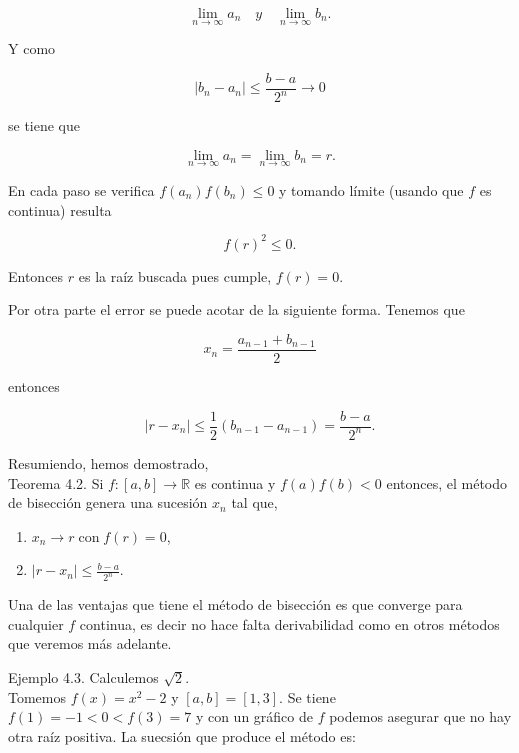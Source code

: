 \documentclass[10pt]{book}
\begin{document}
$$
\lim _{n \rightarrow \infty} a_{n} \quad y \quad \lim _{n \rightarrow \infty} b_{n} .
$$

Y como

$$
\left|b_{n}-a_{n}\right| \leq \frac{b-a}{2^{n}} \rightarrow 0
$$

se tiene que

$$
\lim _{n \rightarrow \infty} a_{n}=\lim _{n \rightarrow \infty} b_{n}=r .
$$

En cada paso se verifica $f\left(a_{n}\right) f\left(b_{n}\right) \leq 0$ y tomando límite (usando que $f$ es continua) resulta

$$
f(r)^{2} \leq 0 .
$$

Entonces $r$ es la raíz buscada pues cumple, $f(r)=0$.

Por otra parte el error se puede acotar de la siguiente forma. Tenemos que

$$
x_{n}=\frac{a_{n-1}+b_{n-1}}{2}
$$

entonces

$$
\left|r-x_{n}\right| \leq \frac{1}{2}\left(b_{n-1}-a_{n-1}\right)=\frac{b-a}{2^{n}} .
$$

Resumiendo, hemos demostrado,\\
Teorema 4.2. Si $f:[a, b] \rightarrow \mathbb{R}$ es continua y $f(a) f(b)<0$ entonces, el método de bisección genera una sucesión $x_{n}$ tal que,

\begin{enumerate}
  \item $x_{n} \rightarrow r \operatorname{con} f(r)=0$,
  \item $\left|r-x_{n}\right| \leq \frac{b-a}{2^{n}}$.
\end{enumerate}

Una de las ventajas que tiene el método de bisección es que converge para cualquier $f$ continua, es decir no hace falta derivabilidad como en otros métodos que veremos más adelante.

Ejemplo 4.3. Calculemos $\sqrt{2}$.\\
Tomemos $f(x)=x^{2}-2$ y $[a, b]=[1,3]$. Se tiene $f(1)=-1<0<f(3)=7$ y con un gráfico de $f$ podemos asegurar que no hay otra raíz positiva. La suecsión que produce el método es:
\end{document}

